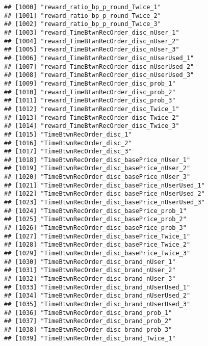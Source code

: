 \documentclass[10pt]{report}
\begin{document}
\begin{verbatim}
## [1000] "reward_ratio_bp_p_round_Twice_1"                      
## [1001] "reward_ratio_bp_p_round_Twice_2"                      
## [1002] "reward_ratio_bp_p_round_Twice_3"                      
## [1003] "reward_TimeBtwnRecOrder_disc_nUser_1"                 
## [1004] "reward_TimeBtwnRecOrder_disc_nUser_2"                 
## [1005] "reward_TimeBtwnRecOrder_disc_nUser_3"                 
## [1006] "reward_TimeBtwnRecOrder_disc_nUserUsed_1"             
## [1007] "reward_TimeBtwnRecOrder_disc_nUserUsed_2"             
## [1008] "reward_TimeBtwnRecOrder_disc_nUserUsed_3"             
## [1009] "reward_TimeBtwnRecOrder_disc_prob_1"                  
## [1010] "reward_TimeBtwnRecOrder_disc_prob_2"                  
## [1011] "reward_TimeBtwnRecOrder_disc_prob_3"                  
## [1012] "reward_TimeBtwnRecOrder_disc_Twice_1"                 
## [1013] "reward_TimeBtwnRecOrder_disc_Twice_2"                 
## [1014] "reward_TimeBtwnRecOrder_disc_Twice_3"                 
## [1015] "TimeBtwnRecOrder_disc_1"                              
## [1016] "TimeBtwnRecOrder_disc_2"                              
## [1017] "TimeBtwnRecOrder_disc_3"                              
## [1018] "TimeBtwnRecOrder_disc_basePrice_nUser_1"              
## [1019] "TimeBtwnRecOrder_disc_basePrice_nUser_2"              
## [1020] "TimeBtwnRecOrder_disc_basePrice_nUser_3"              
## [1021] "TimeBtwnRecOrder_disc_basePrice_nUserUsed_1"          
## [1022] "TimeBtwnRecOrder_disc_basePrice_nUserUsed_2"          
## [1023] "TimeBtwnRecOrder_disc_basePrice_nUserUsed_3"          
## [1024] "TimeBtwnRecOrder_disc_basePrice_prob_1"               
## [1025] "TimeBtwnRecOrder_disc_basePrice_prob_2"               
## [1026] "TimeBtwnRecOrder_disc_basePrice_prob_3"               
## [1027] "TimeBtwnRecOrder_disc_basePrice_Twice_1"              
## [1028] "TimeBtwnRecOrder_disc_basePrice_Twice_2"              
## [1029] "TimeBtwnRecOrder_disc_basePrice_Twice_3"              
## [1030] "TimeBtwnRecOrder_disc_brand_nUser_1"                  
## [1031] "TimeBtwnRecOrder_disc_brand_nUser_2"                  
## [1032] "TimeBtwnRecOrder_disc_brand_nUser_3"                  
## [1033] "TimeBtwnRecOrder_disc_brand_nUserUsed_1"              
## [1034] "TimeBtwnRecOrder_disc_brand_nUserUsed_2"              
## [1035] "TimeBtwnRecOrder_disc_brand_nUserUsed_3"              
## [1036] "TimeBtwnRecOrder_disc_brand_prob_1"                   
## [1037] "TimeBtwnRecOrder_disc_brand_prob_2"                   
## [1038] "TimeBtwnRecOrder_disc_brand_prob_3"                   
## [1039] "TimeBtwnRecOrder_disc_brand_Twice_1"                  

\end{verbatim}
\end{document}
